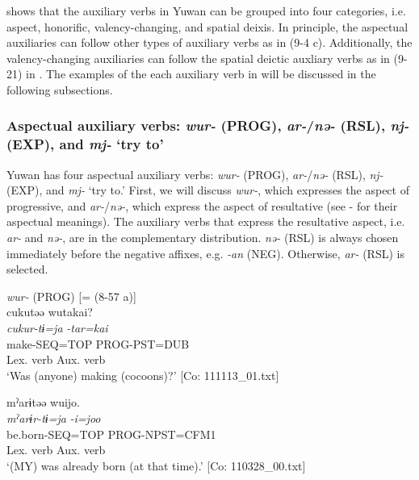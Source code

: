  shows that the auxiliary verbs in Yuwan can be grouped into four categories, i.e. aspect, honorific, valency-changing, and spatial deixis. In principle, the aspectual auxiliaries can follow other types of auxiliary verbs as in (9-4 c). Additionally, the valency-changing auxiliaries can follow the spatial deictic auxliary verbs as in (9-21) in . The examples of the each auxiliary verb in  will be discussed in the following subsections.

\subsubsection{Aspectual auxiliary verbs: \textit{wur-} (PROG), \textit{ar-}/\textit{nə-} (RSL), \textit{nj-} (EXP), and \textit{mj-} ‘try to’}\label{sec:9.1.1.1}

Yuwan has four aspectual auxiliary verbs: \textit{wur-} (PROG), \textit{ar-}/\textit{nə-} (RSL), \textit{nj-} (EXP), and \textit{mj-} ‘try to.’ First, we will discuss \textit{wur-}, which expresses the aspect of progressive, and \textit{ar-}/\textit{nə-}, which express the aspect of resultative (see  -  for their aspectual meanings). The auxiliary verbs that express the resultative aspect, i.e. \textit{ar-} and \textit{nə-}, are in the complementary distribution. \textit{nə-} (RSL) is always chosen immediately before the negative affixes, e.g. \textit{{}-an} (NEG). Otherwise, \textit{ar-} (RSL) is selected.

\ea   \textit{wur-} (PROG) \label{ex:9.7}
  \ea \label{ex:9.7a} [= (8-57 a)]\\
   \gllll     cukutəə  wutakai?\\
      \textit{cukur-tɨ=ja}  \textit{-tar=kai}\\
      make-SEQ=TOP  PROG-PST=DUB\\
      Lex. verb  Aux. verb\\
      \glt       ‘Was (anyone) making (cocoons)?’ [Co: 111113\_01.txt]

\ex \label{ex:9.7b} %
    \gllll  mˀarɨtəə  wuijo.\\
      \textit{mˀarɨr-tɨ=ja}  \textit{-i=joo}\\
      be.born-SEQ=TOP  PROG-NPST=CFM1\\
      Lex. verb  Aux. verb\\
      \glt       ‘(MY) was already born (at that time).’ [Co: 110328\_00.txt]


